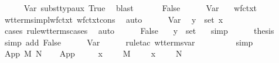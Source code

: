 \begin{isabellebody}
\ \ \ \ \isamarkupfalse%
\ Var\ subst{\isacharunderscore}typ{\isacharunderscore}aux\ True\ \isamarkupfalse%
\ blast\isanewline
\ \ \isamarkupfalse%
\isanewline
\ \ \isamarkupfalse%
\ False\isanewline
\ \ \ \ \isamarkupfalse%
\ Var\ \isamarkupfalse%
\ {}{\isacharcolon}\ {\isachardoublequoteopen}wf{\isacharunderscore}ctxt\ {\isasymGamma}{\isachardoublequoteclose}\ \isamarkupfalse%
\ wt{\isacharunderscore}terms{\isacharunderscore}impl{\isacharunderscore}wf{\isacharunderscore}ctxt\ wf{\isacharunderscore}ctxt{\isacharunderscore}cons\ \isamarkupfalse%
\ auto\isanewline
\ \ \ \ \isamarkupfalse%
\ Var\ \isamarkupfalse%
\ {\isachardoublequoteopen}{\isacharparenleft}y{\isacharcomma}{\isasymsigma}{\isacharparenright}\ {\isasymin}\ set\ {\isacharparenleft}{\isacharparenleft}x{\isacharcomma}\ {\isasymtau}{\isacharparenright}\ {\isacharhash}\ {\isasymGamma}{\isacharparenright}{\isachardoublequoteclose}\ \isamarkupfalse%
\ {\isacharparenleft}cases\ rule{\isacharcolon}wt{\isacharunderscore}terms{\isachardot}cases{\isacharparenright}\ \isamarkupfalse%
\ auto\isanewline
\ \ \ \ \isamarkupfalse%
\ False\ \isamarkupfalse%
\ {}{\isacharcolon}\ {\isachardoublequoteopen}{\isacharparenleft}y{\isacharcomma}{\isasymsigma}{\isacharparenright}\ {\isasymin}\ set\ {\isasymGamma}{\isachardoublequoteclose}\ \isamarkupfalse%
\ simp\isanewline
\isanewline
\ \ \ \ \isamarkupfalse%
\ {\isacharquery}thesis\isanewline
\ \ \ \ \isamarkupfalse%
\ {\isacharparenleft}simp\ add{\isacharcolon}\ False{\isacharparenright}\isanewline
\ \ \ \ \isamarkupfalse%
\ Var\isanewline
\ \ \ \ \isamarkupfalse%
\ {\isacharparenleft}rule{\isacharunderscore}tac\ wt{\isacharunderscore}terms{\isachardot}var{\isacharparenright}\isanewline
\ \ \ \ \isamarkupfalse%
\ {}\ {}\ \isamarkupfalse%
\ simp{\isacharplus}\isanewline
\ \ \isamarkupfalse%
\isanewline
{}\isamarkupfalse%
\isanewline
{}\isamarkupfalse%
\ {\isacharparenleft}App\ M{\isacharprime}\ N{\isacharprime}{\isacharparenright}\isanewline
\ \ \isamarkupfalse%
\ App{\isacharparenleft}{}{\isacharparenright}\ \isamarkupfalse%
\ {\isasympi}\ \ \ {\isachardoublequoteopen}{\isacharparenleft}x{\isacharcomma}\ {\isasymtau}{\isacharparenright}\ {\isacharhash}\ {\isasymGamma}\ {\isasymturnstile}\ M{\isacharprime}\ {\isacharcolon}\ {\isasympi}\ {\isasymrightarrow}\ {\isasymsigma}{\isachardoublequoteclose}\ {\isachardoublequoteopen}{\isacharparenleft}x{\isacharcomma}\ {\isasymtau}{\isacharparenright}\ {\isacharhash}\ {\isasymGamma}\ {\isasymturnstile}\ N{\isacharprime}\ {\isacharcolon}\ {\isasympi}{\isachardoublequoteclose}\ \isanewline

\end{isabellebody}
